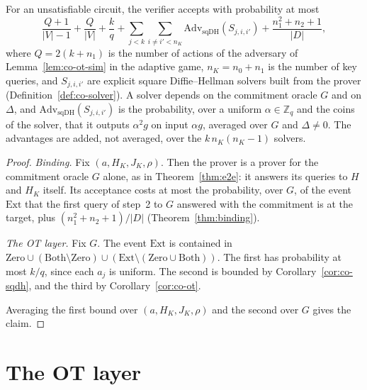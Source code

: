 \begin{theorem}
  \label{thm:co-sound}
  \leanok
  For an unsatisfiable circuit, the verifier accepts with probability at most
  \[ \frac{Q + 1}{|V| - 1} + \frac{Q}{|V|} + \frac{k}{q}
     + \sum_{j < k} \sum_{i \neq i' < n_K} \mathrm{Adv}_{\mathrm{sqDH}}(S_{j,i,i'})
     + \frac{n_1^2 + n_2 + 1}{|D|} , \]
  where $Q = 2(k + n_1)$ is the number of actions of the adversary of Lemma~\ref{lem:co-ot-sim} in the
  adaptive game, $n_K = n_0 + n_1$ is the number of key queries, and $S_{j,i,i'}$ are explicit
  square Diffie--Hellman solvers built from the prover (Definition~\ref{def:co-solver}). A solver
  depends on the commitment oracle $G$ and on $\Delta$, and $\mathrm{Adv}_{\mathrm{sqDH}}(S_{j,i,i'})$
  is the probability, over a uniform $\alpha \in \mathbb{Z}_q$ and the coins of the solver, that it
  outputs $\alpha^2 g$ on input $\alpha g$, averaged over $G$ and $\Delta \neq 0$. The advantages are added,
  not averaged, over the $k\, n_K (n_K - 1)$ solvers.
\end{theorem}

\begin{proof}
  \leanok
  \emph{Binding.} Fix $(a, H_K, J_K, \rho)$. Then the prover is a prover for the commitment oracle
  $G$ alone, as in Theorem~\ref{thm:e2e}: it answers its queries to $H$ and $H_K$ itself. Its
  acceptance costs at most the probability, over $G$, of the event $\mathrm{Ext}$ that the first query
  of step~2 to $G$ answered with the commitment is at the target, plus $(n_1^2 + n_2 + 1)/|D|$
  (Theorem~\ref{thm:binding}).

  \emph{The OT layer.} Fix $G$. The event $\mathrm{Ext}$ is contained in $\mathrm{Zero} \cup
  (\mathrm{Both} \setminus \mathrm{Zero}) \cup (\mathrm{Ext} \setminus (\mathrm{Zero} \cup
  \mathrm{Both}))$. The first has probability at most $k/q$, since each $a_j$ is uniform. The second
  is bounded by Corollary~\ref{cor:co-sqdh}, and the third by Corollary~\ref{cor:co-ot}.

  Averaging the first bound over $(a, H_K, J_K, \rho)$ and the second over $G$ gives the claim.
\end{proof}

\section{The OT layer}
\label{sec:co-ot}

